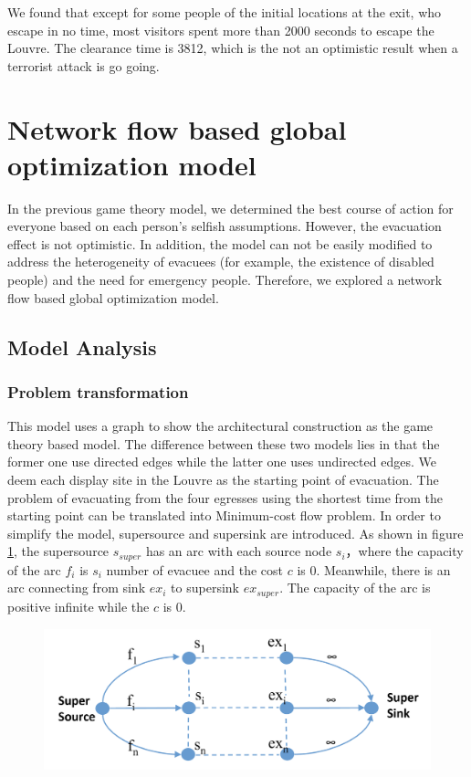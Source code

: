 \documentclass{mcmthesis}
\begin{document}
	We found that except for some people of the initial locations at the exit, who escape in no time,  most visitors spent more than 2000 seconds to escape the Louvre. The clearance time is 3812, which is the not an optimistic result when a terrorist attack is go going.
	
	
	\section{Network flow based global optimization model}
	
	
	In the previous game theory model, we determined the best course of action for everyone based on each person's selfish assumptions. However, the evacuation effect is not optimistic. In addition, the model can not be easily modified to address the heterogeneity of evacuees (for example, the existence of disabled people) and the need for emergency people. Therefore, we explored a network flow based global optimization model.
	
	\subsection{Model Analysis}
	
	\subsubsection{Problem transformation}
	
	This model uses a graph to show the architectural construction as the game theory based model. The difference between these two models lies in that the former one use directed edges while the latter one uses undirected edges. We deem each display site in the Louvre as the starting point of evacuation. The problem of evacuating from the four egresses using the shortest time from the starting point can be translated into Minimum-cost flow problem. In order to simplify the model, supersource and supersink are introduced. As shown in figure \ref{fig:screenshot004}, the  supersource $s_{super}$ has an arc with each source node $s_i$，where the capacity of the arc $f_i$ is $s_i$  number of evacuee and the cost $c$ is 0. Meanwhile, there is an arc connecting from sink $ex_i$ to supersink $ex_{super}$. The capacity of the arc is positive infinite while the $c$ is 0.
	
	\begin{figure}
		\centering
		\includegraphics[width=0.7\linewidth]{../../Figure/screenshot004}
		\caption{}
		\label{fig:screenshot004}
	\end{figure}
	
\end{document}

